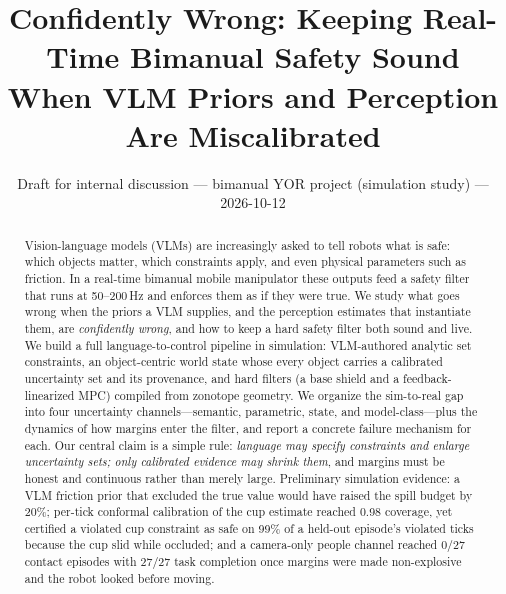 \documentclass[10pt,twocolumn,letterpaper]{article}
\title{\vspace{-1.2em}\Large\bfseries Confidently Wrong: Keeping Real-Time Bimanual Safety Sound\\ When VLM Priors and Perception Are Miscalibrated}
\author{\normalsize Draft for internal discussion --- bimanual YOR project (simulation study) --- 2026-10-12}
\date{\vspace{-2.2em}}
\begin{document}
\maketitle

\begin{abstract}\noindent
Vision-language models (VLMs) are increasingly asked to tell robots what is safe: which objects matter, which constraints apply,
and even physical parameters such as friction. In a real-time bimanual mobile manipulator these outputs feed a safety filter that runs
at 50--200\,Hz and enforces them as if they were true. We study what goes wrong when the priors a VLM supplies, and the perception estimates
that instantiate them, are \emph{confidently wrong}, and how to keep a hard safety filter both sound and live. We build a full
language-to-control pipeline in simulation: VLM-authored analytic set constraints, an object-centric world state whose every object carries
a calibrated uncertainty set and its provenance, and hard filters (a base shield and a feedback-linearized MPC) compiled from zonotope
geometry. We organize the sim-to-real gap into four uncertainty channels---semantic, parametric, state, and model-class---plus the
dynamics of how margins enter the filter, and report a concrete failure mechanism for each. Our central claim is a simple rule:
\emph{language may specify constraints and enlarge uncertainty sets; only calibrated evidence may shrink them}, and margins must be honest
and continuous rather than merely large. Preliminary simulation evidence: a VLM friction prior that excluded the true value would have
raised the spill budget by 20\%; per-tick conformal calibration of the cup estimate reached 0.98 coverage, yet certified a violated cup constraint as safe on 99\% of a held-out episode's violated ticks because the cup slid while occluded; and a camera-only people channel reached 0/27 contact episodes with 27/27 task completion once margins were made
non-explosive and the robot looked before moving.
\end{abstract}
\end{document}
